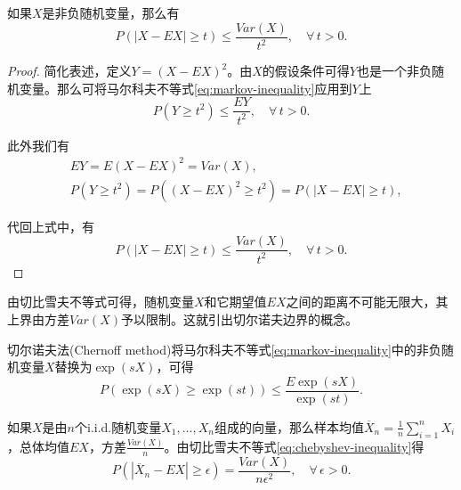 \begin{theorem}[切比雪夫不等式]
  \label{theorem:chebyshev-inequality}
  如果$X$是非负随机变量，那么有
  \begin{equation}
    \label{eq:chebyshev-inequality}
      P \left( \left| X - E X \right| \ge t \right) \le \frac{Var(X)}{t^{2}}, \quad \forall \, t > 0.
  \end{equation}
\end{theorem}
\begin{proof}
  简化表述，定义$Y = \left( X - EX \right)^{2}$。由$X$的假设条件可得$Y$也是一个非负随机变量。那么可将马尔科夫不等式\eqref{eq:markov-inequality}应用到$Y$上
  \begin{equation*}
    P \left( Y \ge t^{2} \right) \le \frac{E Y}{t^{2}}, \quad \forall \, t > 0.
  \end{equation*}

  此外我们有
  \begin{align*}
    & EY = E \left( X - EX \right)^{2} = Var(X), \\
    & P  \left( Y \ge t^{2} \right) = P \left( \left( X - EX \right)^{2}  \ge t^{2} \right) = P \left( \left| X - E X \right| \ge t \right),
  \end{align*}

  代回上式中，有
  \begin{equation*}
    P \left( \left| X - E X \right| \ge t \right) \le \frac{Var(X)}{t^{2}}, \quad \forall \, t > 0.
  \end{equation*}
\end{proof}

由切比雪夫不等式可得，随机变量$X$和它期望值$E X$之间的距离不可能无限大，其上界由方差$Var(X)$予以限制。这就引出切尔诺夫边界的概念。

\begin{theorem}[切尔诺夫法]
  \label{theorem:chernoff-method}
  切尔诺夫法(Chernoff method)将马尔科夫不等式\eqref{eq:markov-inequality}中的非负随机变量$X$替换为$\exp \left( s X \right)$，可得
  \begin{equation}
    \label{eq:chernoff-method-rv}
    P \left( \exp \left( s X \right) \ge \exp \left( s t \right) \right)
    \le \frac{E \exp \left( s X \right)}{\exp \left( s t \right)}.
  \end{equation}

  如果$X$是由$n$个i.i.d.随机变量$X_{1},\ldots,X_{n}$组成的向量，那么样本均值$\overline{X}_{n} = \frac{1}{n} \sum_{i=1}^{n} X_{i}$，总体均值$E X$，方差$\frac{Var(X)}{n}$。由切比雪夫不等式\eqref{eq:chebyshev-inequality}得
  \begin{equation}
    \label{eq:chernoff-method-vector}
    P \left( \left| \overline{X}_{n} - E X \right| \ge \epsilon \right)
    = \frac{Var(X)}{n \epsilon^{2}}, \quad \forall \, \epsilon > 0.
  \end{equation}
\end{theorem}

